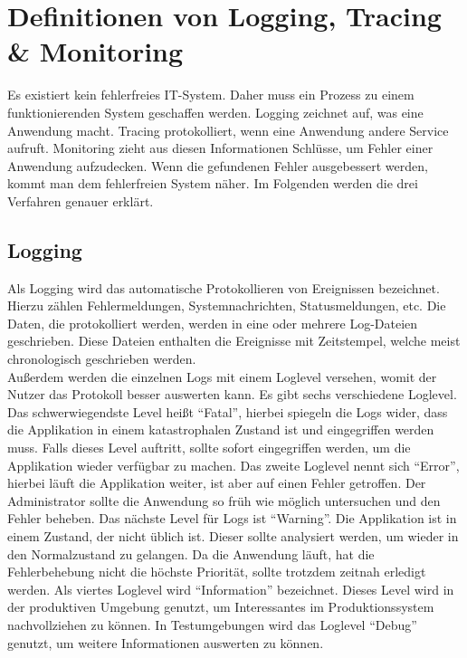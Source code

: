\chapter{Definitionen von Logging, Tracing {\selectfont \&} Monitoring}\label{ch:definition-von-logging-tracing-&-monitoring}
Es existiert kein fehlerfreies IT-System.
Daher muss ein Prozess zu einem funktionierenden System geschaffen werden.
Logging zeichnet auf, was eine Anwendung macht.
Tracing protokolliert, wenn eine Anwendung andere Service aufruft.
Monitoring zieht aus diesen Informationen Schlüsse, um Fehler einer Anwendung aufzudecken.
Wenn die gefundenen Fehler ausgebessert werden, kommt man dem fehlerfreien System näher.
Im Folgenden werden die drei Verfahren genauer erklärt.


\section{Logging}\label{sec:logging}
Als Logging wird das automatische Protokollieren von Ereignissen bezeichnet.
Hierzu zählen Fehlermeldungen, Systemnachrichten, Statusmeldungen, etc.
Die Daten, die protokolliert werden, werden in eine oder mehrere Log-Dateien geschrieben.
Diese Dateien enthalten die Ereignisse mit Zeitstempel, welche meist chronologisch geschrieben werden.
\\
Außerdem werden die einzelnen Logs mit einem Loglevel versehen, womit der Nutzer das Protokoll besser auswerten kann.
Es gibt sechs verschiedene Loglevel.
Das schwerwiegendste Level heißt \enquote{Fatal}, hierbei spiegeln die Logs wider, dass die Applikation in einem katastrophalen Zustand ist und eingegriffen werden muss.
Falls dieses Level auftritt, sollte sofort eingegriffen werden, um die Applikation wieder verfügbar zu machen.
Das zweite Loglevel nennt sich \enquote{Error}, hierbei läuft die Applikation weiter, ist aber auf einen Fehler getroffen.
Der Administrator sollte die Anwendung so früh wie möglich untersuchen und den Fehler beheben.
Das nächste Level für Logs ist \enquote{Warning}.
Die Applikation ist in einem Zustand, der nicht üblich ist.
Dieser sollte analysiert werden, um wieder in den Normalzustand zu gelangen.
Da die Anwendung läuft, hat die Fehlerbehebung nicht die höchste Priorität, sollte trotzdem zeitnah erledigt werden.
Als viertes Loglevel wird \enquote{Information} bezeichnet.
Dieses Level wird in der produktiven Umgebung genutzt, um Interessantes im Produktionssystem nachvollziehen zu können.
In Testumgebungen wird das Loglevel \enquote{Debug} genutzt, um weitere Informationen auswerten zu können.
